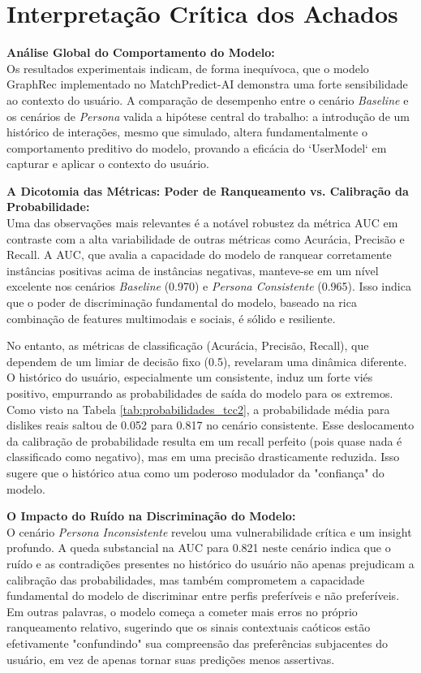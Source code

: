 \section{Interpretação Crítica dos Achados}
\label{sec:discussao_interpretacao}

\textbf{Análise Global do Comportamento do Modelo:} \\
Os resultados experimentais indicam, de forma inequívoca, que o modelo GraphRec implementado no MatchPredict-AI demonstra uma forte sensibilidade ao contexto do usuário. A comparação de desempenho entre o cenário \textit{Baseline} e os cenários de \textit{Persona} valida a hipótese central do trabalho: a introdução de um histórico de interações, mesmo que simulado, altera fundamentalmente o comportamento preditivo do modelo, provando a eficácia do `UserModel` em capturar e aplicar o contexto do usuário.

\textbf{A Dicotomia das Métricas: Poder de Ranqueamento vs. Calibração da Probabilidade:} \\
Uma das observações mais relevantes é a notável robustez da métrica AUC em contraste com a alta variabilidade de outras métricas como Acurácia, Precisão e Recall. A AUC, que avalia a capacidade do modelo de ranquear corretamente instâncias positivas acima de instâncias negativas, manteve-se em um nível excelente nos cenários \textit{Baseline} (0.970) e \textit{Persona Consistente} (0.965). Isso indica que o poder de discriminação fundamental do modelo, baseado na rica combinação de features multimodais e sociais, é sólido e resiliente.

No entanto, as métricas de classificação (Acurácia, Precisão, Recall), que dependem de um limiar de decisão fixo (0.5), revelaram uma dinâmica diferente. O histórico do usuário, especialmente um consistente, induz um forte viés positivo, empurrando as probabilidades de saída do modelo para os extremos. Como visto na Tabela \ref{tab:probabilidades_tcc2}, a probabilidade média para dislikes reais saltou de 0.052 para 0.817 no cenário consistente. Esse deslocamento da calibração de probabilidade resulta em um recall perfeito (pois quase nada é classificado como negativo), mas em uma precisão drasticamente reduzida. Isso sugere que o histórico atua como um poderoso modulador da "confiança" do modelo.

\textbf{O Impacto do Ruído na Discriminação do Modelo:} \\
O cenário \textit{Persona Inconsistente} revelou uma vulnerabilidade crítica e um insight profundo. A queda substancial na AUC para 0.821 neste cenário indica que o ruído e as contradições presentes no histórico do usuário não apenas prejudicam a calibração das probabilidades, mas também comprometem a capacidade fundamental do modelo de discriminar entre perfis preferíveis e não preferíveis. Em outras palavras, o modelo começa a cometer mais erros no próprio ranqueamento relativo, sugerindo que os sinais contextuais caóticos estão efetivamente "confundindo" sua compreensão das preferências subjacentes do usuário, em vez de apenas tornar suas predições menos assertivas.

